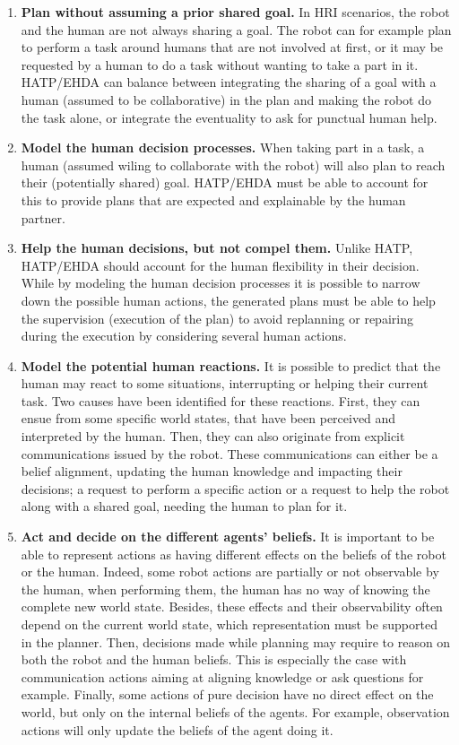 \begin{enumerate}
    \item \textbf{Plan without assuming a prior shared goal.} In HRI scenarios, the robot and the human are not always sharing a goal. The robot can for example plan to perform a task around humans that are not involved at first, or it may be requested by a human to do a task without wanting to take a part in it. HATP/EHDA can balance between integrating the sharing of a goal with a human (assumed to be collaborative) in the plan and making the robot do the task alone, or integrate the eventuality to ask for punctual human help. 

    \item \textbf{Model the human decision processes.} When taking part in a task, a human (assumed wiling to collaborate with the robot) will also plan to reach their (potentially shared) goal. HATP/EHDA must be able to account for this to provide plans that are expected and explainable by the human partner.

    \item \textbf{Help the human decisions, but not compel them.} Unlike HATP, HATP/EHDA should account for the human flexibility in their decision. While by modeling the human decision processes it is possible to narrow down the possible human actions, the generated plans must be able to help the supervision (execution of the plan) to avoid replanning or repairing during the execution by considering several human actions.

    \item \textbf{Model the potential human reactions.} It is possible to predict that the human may react to some situations, interrupting or helping their current task. Two causes have been identified for these reactions. First, they can ensue from some specific world states, that have been perceived and interpreted by the human. Then, they can also originate from explicit communications issued by the robot. These communications can either be a belief alignment, updating the human knowledge and impacting their decisions; a request to perform a specific action or a request to help the robot along with a shared goal, needing the human to plan for it.

    \item \textbf{Act and decide on the different agents' beliefs.} It is important to be able to represent actions as having different effects on the beliefs of the robot or the human. Indeed, some robot actions are partially or not observable by the human, when performing them, the human has no way of knowing the complete new world state. Besides, these effects and their observability often depend on the current world state, which representation must be supported in the planner. Then, decisions made while planning may require to reason on both the robot and the human beliefs. This is especially the case with communication actions aiming at aligning knowledge or ask questions for example. Finally, some actions of pure decision have no direct effect on the world, but only on the internal beliefs of the agents. For example, observation actions will only update the beliefs of the agent doing it.


\end{enumerate}
